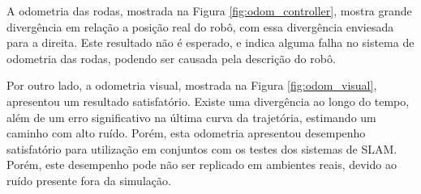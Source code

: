 \documentclass[repeatfields,xlists,xpacks,oneside,yearsonly]{ufrgscca}
\begin{document}
A odometria das rodas, mostrada na Figura \ref{fig:odom_controller},
mostra grande divergência em relação a posição real do robô, com essa
divergência enviesada para a direita.
Este resultado não é esperado, e indica alguma falha no sistema de odometria
das rodas, podendo ser causada pela descrição do robô.

Por outro lado, a odometria visual, mostrada na Figura \ref{fig:odom_visual},
apresentou um resultado satisfatório. Existe uma divergência ao longo do tempo,
além de um erro significativo na última curva da trajetória, estimando um caminho
com alto ruído.
Porém, esta odometria apresentou desempenho satisfatório para utilização
em conjuntos com os testes dos sistemas de SLAM.
Porém, este desempenho pode não ser replicado em ambientes reais, devido
ao ruído presente fora da simulação.
\end{document}
